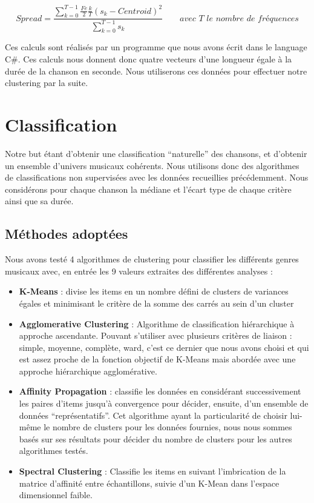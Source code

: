 \documentclass[soumission]{ir}
\begin{document}
\begin{equation}
    Spread = \frac{ \sum_{k = 0}^{T-1} \frac{Fe}{2} \frac{k}{T} (s_k - Centroid)^2}{\sum_{k=0}^{T-1} s_k}
    \qquad \textit{avec T le nombre de fréquences}
\end{equation}

Ces calculs sont réalisés par un programme que nous avons écrit dans le language C\#. Ces calculs nous donnent 
donc quatre vecteurs d’une longueur égale à la durée de la chanson en seconde. Nous utiliserons ces données 
pour effectuer notre clustering par la suite.

\section{Classification}
Notre but étant d’obtenir une classification “naturelle” des chansons, et d’obtenir un ensemble d’univers 
musicaux cohérents. Nous utilisons donc des algorithmes de classifications non supervisées avec les données 
recueillies précédemment. Nous considérons pour chaque chanson la médiane et l’écart type de chaque critère
ainsi que sa durée.

\subsection{Méthodes adoptées}
Nous avons testé 4 algorithmes de clustering pour classifier les différents genres musicaux avec, en entrée 
les 9 valeurs extraites des différentes analyses :
\begin{itemize}
    \item{\textbf{K-Means} : divise les items en un nombre défini de clusters de variances égales et minimisant le 
    critère de la somme des carrés au sein d’un cluster}
    \item {\textbf{Agglomerative Clustering} : Algorithme de classification hiérarchique à approche ascendante. 
    Pouvant s’utiliser avec plusieurs critères de liaison : simple, moyenne, complète, ward, c’est ce dernier 
    que nous avons choisi et qui est assez proche de la fonction objectif de K-Means mais abordée avec une 
    approche hiérarchique agglomérative.}
    \item{\textbf{Affinity Propagation} : classifie les données en considérant successivement les paires d’items jusqu’à 
    convergence pour décider, ensuite, d’un ensemble de données “représentatifs”. Cet algorithme ayant la 
    particularité de choisir lui-même le nombre de clusters pour les données fournies, nous nous sommes basés 
    sur ses résultats pour décider du nombre de clusters pour les autres algorithmes testés.}
    \item{\textbf{Spectral Clustering} : Classifie les items en suivant l’imbrication de la matrice d’affinité entre 
    échantillons, suivie d’un K-Mean dans l’espace dimensionnel faible.}
\end{itemize}
\end{document}
